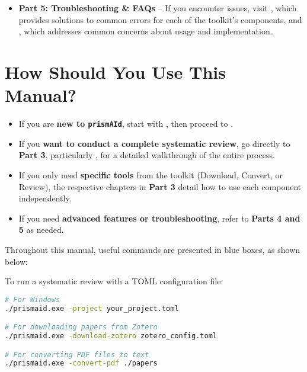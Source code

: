 \begin{itemize}
    \item \textbf{Part 5: Troubleshooting \& FAQs} -- If you encounter issues, visit , which provides solutions to common errors for each of the toolkit's components, and , which addresses common concerns about usage and implementation.
\end{itemize}

\section*{How Should You Use This Manual?}

\begin{itemize}
    \item If you are \textbf{new to \texttt{prismAId}}, start with , then proceed to .
    \item If you \textbf{want to conduct a complete systematic review}, go directly to \textbf{Part 3}, particularly , for a detailed walkthrough of the entire process.
    \item If you only need \textbf{specific tools} from the toolkit (Download, Convert, or Review), the respective chapters in \textbf{Part 3} detail how to use each component independently.
    \item If you need \textbf{advanced features or troubleshooting}, refer to \textbf{Parts 4 and 5} as needed.
\end{itemize}

Throughout this manual, useful commands are presented in blue boxes, as shown below:

\begin{commandbox}
To run a systematic review with a TOML configuration file:
\begin{lstlisting}[language=Bash]
# For Windows
./prismaid.exe -project your_project.toml

# For downloading papers from Zotero
./prismaid.exe -download-zotero zotero_config.toml

# For converting PDF files to text
./prismaid.exe -convert-pdf ./papers
\end{lstlisting}
\end{commandbox}

